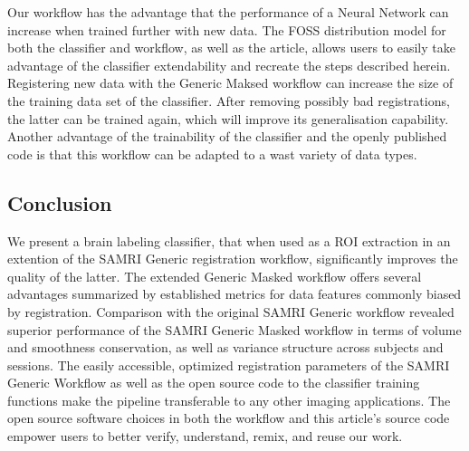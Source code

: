 Our workflow has the advantage that the performance of a Neural Network can increase when trained further with new data.
The FOSS distribution model for both the classifier and workflow, as well as the article, allows users to easily take advantage of the classifier extendability and recreate the steps described herein.
Registering new data with the Generic Maksed workflow can increase the size of the training data set of the classifier.
After removing possibly bad registrations, the latter can be trained again, which will improve its generalisation capability.
Another advantage of the trainability of the classifier and the openly published code is that this workflow can be adapted to a wast variety of data types.

\subsection{Conclusion}

We present a brain labeling classifier, that when used as a ROI extraction in an extention of the SAMRI Generic registration workflow, significantly improves the quality of the latter.
The extended Generic Masked workflow offers several advantages summarized by established metrics for data features commonly biased by registration.
Comparison with the original SAMRI Generic workflow revealed superior performance of the SAMRI Generic Masked workflow in terms of volume and smoothness conservation, as well as variance structure across subjects and sessions.
The easily accessible, optimized registration parameters of the SAMRI Generic Workflow as well as the open source code to the classifier training functions make the pipeline transferable to any other imaging applications.
The open source software choices in both the workflow and this article's source code empower users to better verify, understand, remix, and reuse our work.
